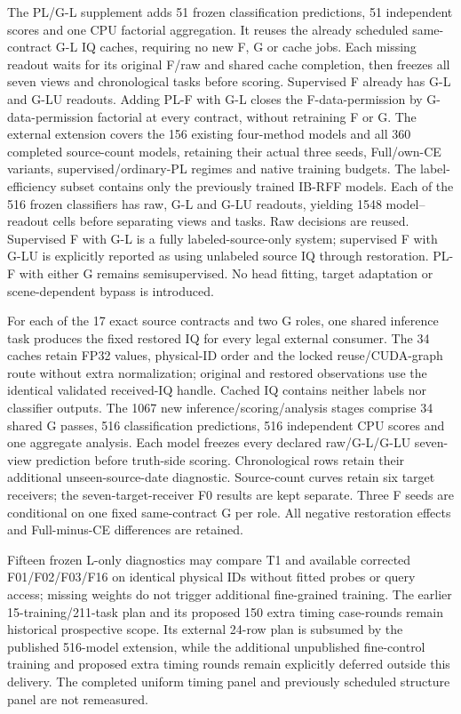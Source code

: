 The PL/G-L supplement adds 51 frozen classification predictions, 51 independent scores and one CPU factorial aggregation. It reuses the already scheduled same-contract G-L IQ caches, requiring no new F, G or cache jobs. Each missing readout waits for its original F/raw and shared cache completion, then freezes all seven views and chronological tasks before scoring. Supervised F already has G-L and G-LU readouts. Adding PL-F with G-L closes the F-data-permission by G-data-permission factorial at every contract, without retraining F or G. The external extension covers the 156 existing four-method models and all 360 completed source-count models, retaining their actual three seeds, Full/own-CE variants, supervised/ordinary-PL regimes and native training budgets. The label-efficiency subset contains only the previously trained IB-RFF models. Each of the 516 frozen classifiers has raw, G-L and G-LU readouts, yielding 1548 model--readout cells before separating views and tasks. Raw decisions are reused. Supervised F with G-L is a fully labeled-source-only system; supervised F with G-LU is explicitly reported as using unlabeled source IQ through restoration. PL-F with either G remains semisupervised. No head fitting, target adaptation or scene-dependent bypass is introduced.

For each of the 17 exact source contracts and two G roles, one shared inference task produces the fixed restored IQ for every legal external consumer. The 34 caches retain FP32 values, physical-ID order and the locked reuse/CUDA-graph route without extra normalization; original and restored observations use the identical validated received-IQ handle. Cached IQ contains neither labels nor classifier outputs. The 1067 new inference/scoring/analysis stages comprise 34 shared G passes, 516 classification predictions, 516 independent CPU scores and one aggregate analysis. Each model freezes every declared raw/G-L/G-LU seven-view prediction before truth-side scoring. Chronological rows retain their additional unseen-source-date diagnostic. Source-count curves retain six target receivers; the seven-target-receiver F0 results are kept separate. Three F seeds are conditional on one fixed same-contract G per role. All negative restoration effects and Full-minus-CE differences are retained.

Fifteen frozen L-only diagnostics may compare T1 and available corrected F01/F02/F03/F16 on identical physical IDs without fitted probes or query access; missing weights do not trigger additional fine-grained training. The earlier 15-training/211-task plan and its proposed 150 extra timing case-rounds remain historical prospective scope. Its external 24-row plan is subsumed by the published 516-model extension, while the additional unpublished fine-control training and proposed extra timing rounds remain explicitly deferred outside this delivery. The completed uniform timing panel and previously scheduled structure panel are not remeasured.
